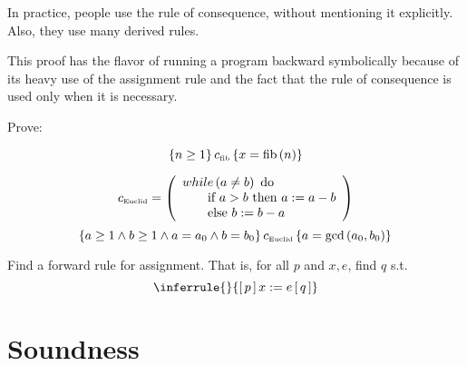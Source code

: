 \begin{enumcirc}
	\item
	In practice, people use the rule of consequence, without mentioning it
	explicitly.
	Also, they use many derived rules.
	\item
	This proof has the flavor of running a program backward symbolically because of
	its heavy use of the assignment rule and the fact that the rule of consequence
	is used only when it is necessary.

	\begin{exercisetab}
		Prove:
		\begin{enumalpha}
			\item
			\[
				\left\{ n \ge 1 \right\}
				c_{\textrm{\tiny fib}}
				\left\{ x = \textrm{fib}\left( n \right) \right\}
			\]
			\item
			\[
				c_{\textrm{\tiny Euclid}} =
				\left( 
					\begin{array}{l}
						while \left( a \ne b \right) \textrm{ do }                  \\
						\qquad \textrm{if } a > b \textrm{ then } a := a - b \\
						\qquad \textrm{else } b := b - a
					\end{array}
				 \right)
			\]
			\[
				\left\{ a \ge 1 \wedge b \ge 1 \wedge a = a_0 \wedge b = b_0 \right\}
				c_{\textrm{\tiny Euclid}}
				\left\{ a = \textrm{gcd}\left( a_0, b_0 \right) \right\}
			\]
		\end{enumalpha}
	\end{exercisetab}

	\begin{exercisetab}
		Find a forward rule for assignment.
		That is, for all $p$ and $x, e$, find $q$ s.t.
		\[
			\inferrule{ }{\brackets{p} x := e \brackets{q}}
		\]
	\end{exercisetab}
\end{enumcirc}

\section{Soundness}

